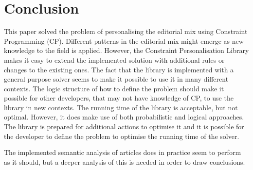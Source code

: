 \chapter{Conclusion} %
\label{ch:conclusion}
This paper solved the problem of personalising the editorial mix using Constraint Programming (CP). Different patterns in the editorial mix might emerge as new knowledge to the field is applied. However, the Constraint Personalisation Library makes it easy to extend the implemented solution with additional rules or changes to the existing ones. The fact that the library is implemented with a general purpose solver seems to make it possible to use it in many different contexts. The logic structure of how to define the problem should make it possible for other developers, that may not have knowledge of CP, to use the library in new contexts. The running time of the library is acceptable, but not optimal. However, it does make use of both probabilistic and logical approaches. The library is prepared for additional actions to optimise it and it is possible for the developer to define the problem to optimise the running time of the solver.

The implemented semantic analysis of articles does in practice seem to perform as it should, but a deeper analysis of this is needed in order to draw conclusions.
